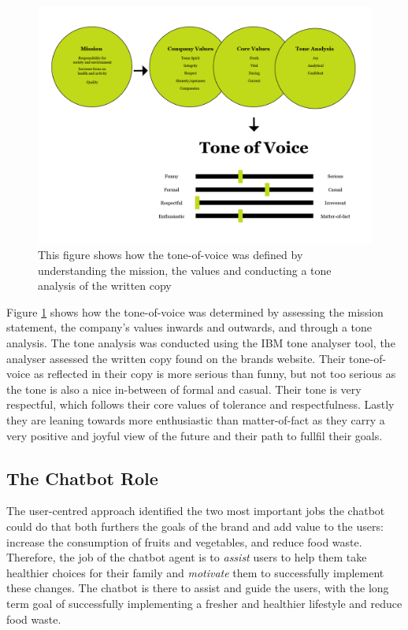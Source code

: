        \begin{figure}
            \centering
            \includegraphics[width=\textwidth]{figures/Tone-of-voice.png}
            \caption{This figure shows how the tone-of-voice was defined by understanding the mission, the values and conducting a tone analysis of the written copy}
            \label{fig:tov}
        \end{figure}
    
        Figure \ref{fig:tov} shows how the tone-of-voice was determined by assessing the mission statement, the company's values inwards and outwards, and through a tone analysis. The tone analysis was conducted using the IBM tone analyser tool, the analyser assessed the written copy found on the brands website. Their tone-of-voice as reflected in their copy is more serious than funny, but not too serious as the tone is also a nice in-between of formal and casual. Their tone is very respectful, which follows their core values of tolerance and respectfulness. Lastly they are leaning towards more enthusiastic than matter-of-fact as they carry a very positive and joyful view of the future and their path to fullfil their goals.

\vspace{5mm}

    \subsection{The Chatbot Role}
    
    The user-centred approach identified the two most important jobs the chatbot could do that both furthers the goals of the brand and add value to the users: increase the consumption of fruits and vegetables, and reduce food waste. Therefore, the job of the chatbot agent is to \textit{assist} users to help them take healthier choices for their family and \textit{motivate} them to successfully implement these changes. The chatbot is there to assist and guide the users, with the long term goal of successfully implementing a fresher and healthier lifestyle and reduce food waste. 
    
